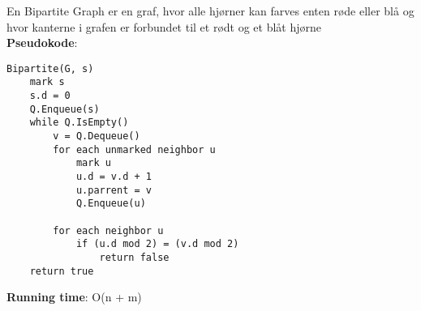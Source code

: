 En Bipartite Graph er en graf, hvor alle hjørner kan farves enten røde eller blå og hvor kanterne i grafen er forbundet til et rødt og et blåt hjørne\\
\textbf{Pseudokode}:
\begin{lstlisting}[frame=single, mathescape=true]
Bipartite(G, s)
	mark s
	s.d = 0
	Q.Enqueue(s)
	while Q.IsEmpty()
		v = Q.Dequeue()
		for each unmarked neighbor u
			mark u
			u.d = v.d + 1
			u.parrent = v
			Q.Enqueue(u)

		for each neighbor u
			if (u.d mod 2) = (v.d mod 2)
				return false
	return true
\end{lstlisting}
\textbf{Running time}: O(n + m)

